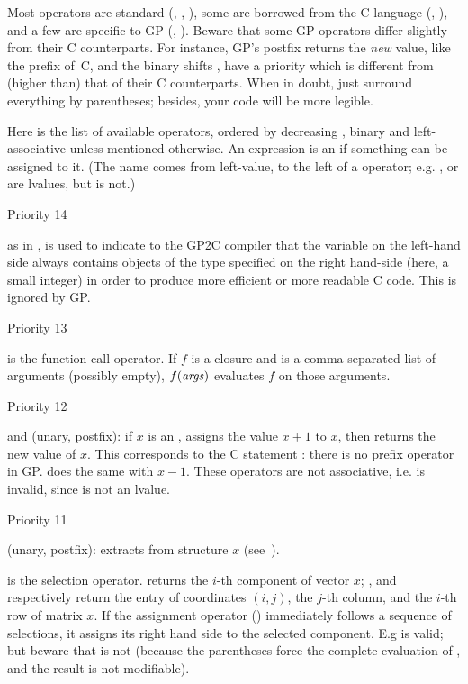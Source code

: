 Most operators are standard (\kbd{+}, \kbd{\%}, \kbd{=}), some are
borrowed from the C language (\kbd{++}, \kbd{<<}), and a few are
specific to GP (\kbd{\bs}, \kbd{\#}). Beware that some GP operators differ
slightly from their C counterparts. For instance, GP's postfix \kbd{++}
returns the \emph{new} value, like the prefix \kbd{++} of~C, and the binary
shifts \kbd{<<}, \kbd{>>} have a priority which is different from (higher
than) that of their C counterparts. When in doubt, just surround everything
by parentheses; besides, your code will be more legible.

\noindent Here is the list of available operators, ordered by decreasing
, binary and left-associative unless mentioned otherwise. An
expression is an  if something can be assigned to it. (The name
comes from left-value, to the left of a \kbd{=} operator; e.g.
, or  are lvalues, but  is not.)

\def\point#1{\noindent\item #1\hfill\break\indent\strut}
\point{Priority 14}
%
\kbd{:} as in , is used to indicate to the GP2C compiler that the
variable on the left-hand side always contains objects of the type specified
on the right hand-side (here, a small integer) in order to produce more
efficient or more readable C code. This is ignored by GP.

%
\point{Priority 13}
\kbd{( )} is the function call operator. If $f$ is a closure and 
is a comma-separated list of arguments (possibly empty),
$f{\tt (\hbox{\it args\/})}$ evaluates $f$ on those arguments.

\point{Priority 12}
%
\kbd{++} and \kbd{--} (unary, postfix): if $x$ is an ,
 assigns the value $x+1$ to $x$, then returns the new value of
$x$. This corresponds to the C statement : there is no prefix
\kbd{++} operator in GP.  does the same with $x-1$. These
operators are not associative, i.e.  is invalid, since
 is not an lvalue.

\point{Priority 11}
%
 (unary, postfix):  extracts
 from structure $x$ (see~).

\kbd{[ ]} is the selection operator.  returns the $i$-th
component of vector $x$; ,  and
 respectively return the entry of coordinates $(i,j)$, the
$j$-th column, and the $i$-th row of matrix $x$. If the assignment operator
(\kbd{=}) immediately follows a sequence of selections, it assigns its right
hand side to the selected component. E.g  is valid; but
beware that  is not (because the parentheses force the
complete evaluation of , and the result is not modifiable).

